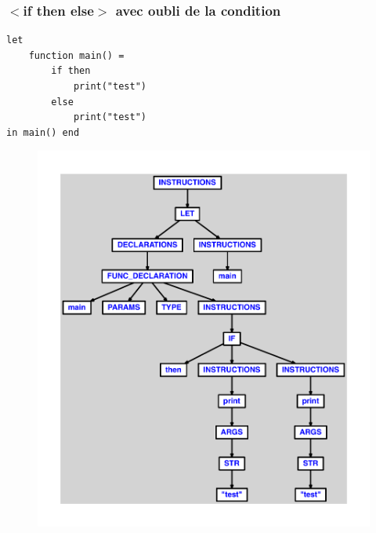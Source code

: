 \documentclass{article}
\begin{document}
\subsubsection{$ < $if then else$ > $ avec oubli de la condition}
\begin{lstlisting}
let
	function main() =
		if then
			print("test")
		else
			print("test")
in main() end
\end{lstlisting}
\newpage
\begin{figure}[H]
\centering
\includegraphics[max width=\textwidth]{ast/ast_254.pdf}
\end{figure}
\newpage
\end{document}
